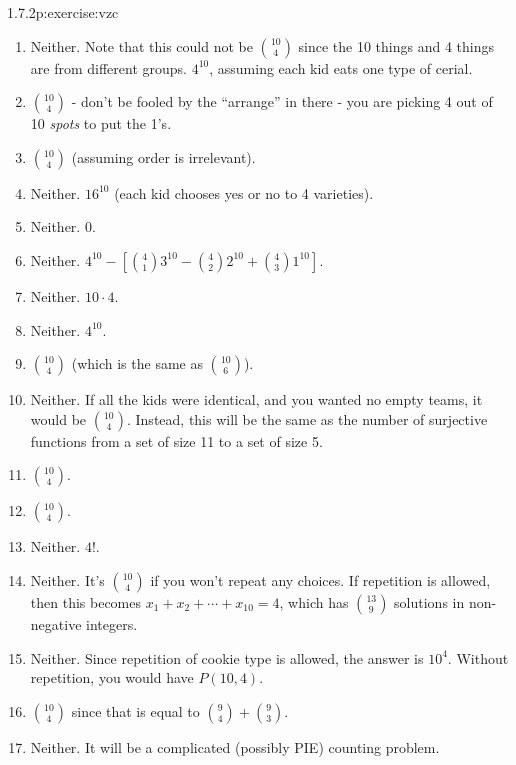 \documentclass[twoside,11pt,]{book}
\numberwithin{equation}{chapter}
\begin{document}
\begin{divisionsolution}{1.7.2}{}{p:exercise:vzc}
\begin{enumerate}[label=(\alph*)]
\item{}Neither. Note that this could not be \({10 \choose 4}\) since the 10 things and 4 things are from different groups. \(4^{10}\), assuming each kid eats one type of cerial.%
\item{}\({10 \choose 4}\) - don't be fooled by the ``arrange'' in there - you are picking 4 out of 10 \emph{spots} to put the 1's.%
\item{}\({10 \choose 4}\) (assuming order is irrelevant).%
\item{}Neither. \(16^{10}\) (each kid chooses yes or no to 4 varieties).%
\item{}Neither. 0.%
\item{}Neither. \(4^{10} - [{4\choose 1}3^{10} - {4\choose 2}2^{10} + {4 \choose 3}1^{10}]\).%
\item{}Neither. \(10\cdot 4\).%
\item{}Neither. \(4^{10}\).%
\item{}\({10 \choose 4}\) (which is the same as \({10 \choose 6}\)).%
\item{}Neither. If all the kids were identical, and you wanted no empty teams, it would be \({10 \choose 4}\). Instead, this will be the same as the number of surjective functions from a set of size 11 to a set of size 5.%
\item{}\({10 \choose 4}\).%
\item{}\({10 \choose 4}\).%
\item{}Neither. \(4!\).%
\item{}Neither. It's \({10 \choose 4}\) if you won't repeat any choices. If repetition is allowed, then this becomes \(x_1 + x_2 + \cdots +x_{10} = 4\), which has \({13 \choose 9}\) solutions in non-negative integers.%
\item{}Neither. Since repetition of cookie type is allowed, the answer is \(10^4\). Without repetition, you would have \(P(10,4)\).%
\item{}\({10 \choose 4}\) since that is equal to \({9 \choose 4} + {9 \choose 3}\).%
\item{}Neither. It will be a complicated (possibly PIE) counting problem.%
\end{enumerate}
%
\end{divisionsolution}%
\end{document}
